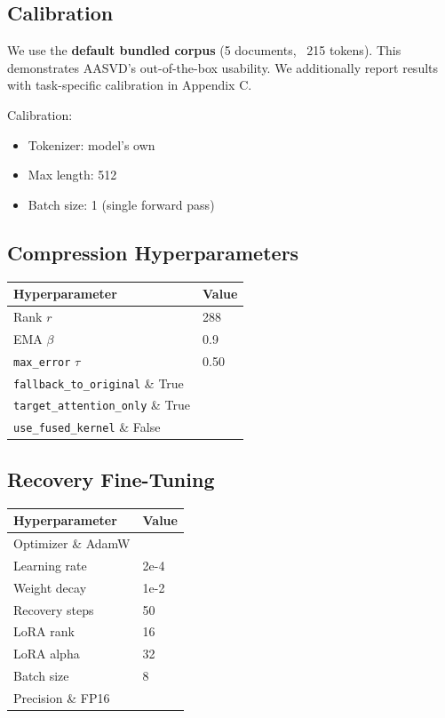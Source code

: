 \subsection{Calibration}

We use the \textbf{default bundled corpus} (5 documents, ~215 tokens). This 
demonstrates AASVD's out-of-the-box usability. We additionally report 
results with task-specific calibration in Appendix C.

Calibration:
\begin{itemize}
\item Tokenizer: model's own
\item Max length: 512
\item Batch size: 1 (single forward pass)

\end{itemize}
\subsection{Compression Hyperparameters}

\begin{table}[H]
\centering
\small
\begin{tabular}{ll}
\toprule
\textbf{Hyperparameter} & \textbf{Value} \\
\midrule
Rank $r$ & 288 \\
EMA $\beta$ & 0.9 \\
\texttt{max\_error} $\tau$ & 0.50 \\
\texttt{fallback\_to\_original} \& True \\
\texttt{target\_attention\_only} \& True \\
\texttt{use\_fused\_kernel} \& False \\
\bottomrule
\end{tabular}
\end{table}

\subsection{Recovery Fine-Tuning}

\begin{table}[H]
\centering
\small
\begin{tabular}{ll}
\toprule
\textbf{Hyperparameter} & \textbf{Value} \\
\midrule
Optimizer \& AdamW \\
Learning rate & 2e-4 \\
Weight decay & 1e-2 \\
Recovery steps & 50 \\
LoRA rank & 16 \\
LoRA alpha & 32 \\
Batch size & 8 \\
Precision \& FP16 \\
\bottomrule
\end{tabular}
\end{table}

